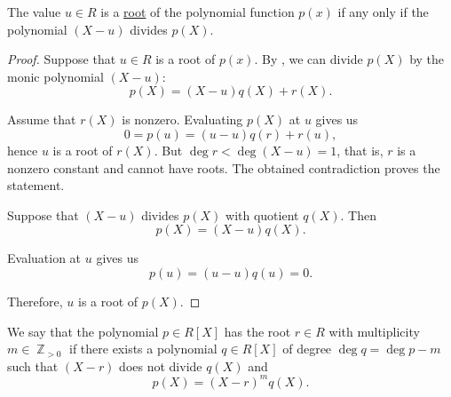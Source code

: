 \begin{proposition}\label{thm:polynomial_root_iff_divisible}
  The value \( u \in R \) is a \hyperref[def:semiring_kernel]{root} of the polynomial function \( p(x) \) if any only if the polynomial \( (X - u) \) divides \( p(X) \).
\end{proposition}
\begin{proof}
  \SufficiencySubProof Suppose that \( u \in R \) is a root of \( p(x) \). By , we can divide \( p(X) \) by the monic polynomial \( (X - u) \):
  \begin{equation*}
    p(X) = (X - u) q(X) + r(X).
  \end{equation*}

  Assume that \( r(X) \) is nonzero. Evaluating \( p(X) \) at \( u \) gives us
  \begin{equation*}
    0 = p(u) = (u - u) q(r) + r(u),
  \end{equation*}
  hence \( u \) is a root of \( r(X) \). But \( \deg r < \deg (X - u) = 1 \), that is, \( r \) is a nonzero constant and cannot have roots. The obtained contradiction proves the statement.

  \NecessitySubProof Suppose that \( (X - u) \) divides \( p(X) \) with quotient \( q(X) \). Then
  \begin{equation*}
    p(X) = (X - u) q(X).
  \end{equation*}

  Evaluation at \( u \) gives us
  \begin{equation*}
    p(u) = (u - u) q(u) = 0.
  \end{equation*}

  Therefore, \( u \) is a root of \( p(X) \).
\end{proof}

\begin{definition}\label{def:polynomial_root_multiplicity}
  We say that the polynomial \( p \in R[X] \) has the root \( r \in R \) with multiplicity \( m \in \BbbZ_{>0} \) if there exists a polynomial \( q \in R[X] \) of degree \( \deg q = \deg p - m \) such that \( (X - r) \) does not divide \( q(X) \) and
  \begin{equation*}
    p(X) = (X - r)^m q(X).
  \end{equation*}
\end{definition}

